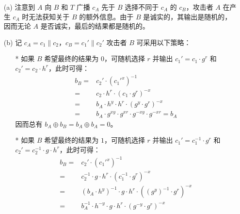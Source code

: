 \begin{questions}
        \begin{solution}
            \begin{enumerate}
                \item[(a)] 注意到 $A$ 向 $B$ 和 $T$ 广播 $c_A$ 先于 $B$ 选择不同于 $c_A$ 的 $c_B$，攻击者 $A$ 在产生 $c_A$ 时无法获知关于 $B$ 的额外信息。由于 $B$ 是诚实的，其输出是随机的，因而无论 $A$ 是否诚实，最后的结果都是随机的。
                \item[(b)] 记 $c_A=c_1\parallel{c}_2$，$c_B=c_1'\parallel{c}_2'$ 攻击者 $B$ 可采用以下策略：
                    \begin{enumerate}
                        \item[*] 如果 $B$ 希望最终的结果为 $0$，可随机选择 $r$ 并输出 $c_1'=c_1\cdot{g}^r$ 和 $c_2'=c_2\cdot{h}^r$，此时可得：
                            \begin{equation}
                                \begin{aligned}
                                    b_B=&c_2'\cdot({c_1'^x})^{-1}\\
                                    =&c_2\cdot{h}^r\cdot(c_1\cdot{g}^r)^{-x}\\
                                    =&b_A\cdot{h}^y\cdot{h}^r\cdot(g^y\cdot{g}^r)^{-x}\\
                                    =&b_A\cdot{g}^{xy}\cdot{g}^{xr}\cdot{g}^{-xy}\cdot{g}^{-xr}=b_A
                                \end{aligned}
                            \end{equation}
                        因而总有 $b_A\oplus{b}_B=b_A\oplus{b}_A=0$。
                        \item[*] 如果 $B$ 希望最终的结果为 $1$，可随机选择 $r$ 并输出 $c_1'=c_1^{-1}\cdot{g}^r$ 和 $c_2'=c_2^{-1}\cdot{g}\cdot{h}^r$，此时可得：
                            \begin{equation}
                                \begin{aligned}
                                    b_B=&c_2'\cdot({c_1'^x})^{-1}\\
                                    =&c_2^{-1}\cdot{g}\cdot{h}^r\cdot(c_1^{-1}\cdot{g}^r)^{-x}\\
                                    =&(b_A\cdot{h}^y)^{-1}\cdot{g}\cdot{h}^r\cdot((g^y)^{-1}\cdot{g}^r)^{-x}\\
                                    =&b_A^{-1}\cdot{h}^{-y}\cdot{g}\cdot{h}^r\cdot(g^{-y}\cdot{g}^r)^{-x}\\

\end{aligned}
\end{equation}
\end{enumerate}
\end{enumerate}
\end{solution}
\end{questions}
